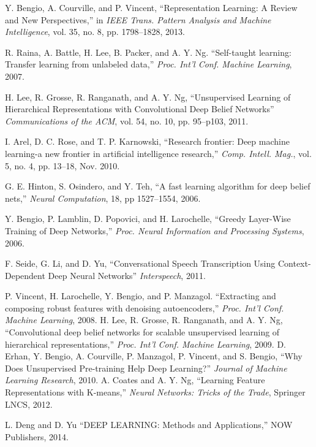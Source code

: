 \documentclass[conference]{IEEEtran}
\begin{document}
\begin{thebibliography}{99}

 Y. Bengio, A. Courville, and P. Vincent, ``Representation Learning: A Review and New Perspectives,'' in \textit{IEEE Trans. Pattern Analysis and Machine Intelligence}, vol. 35, no. 8, pp. 1798--1828, 2013.

 R. Raina, A. Battle, H. Lee, B. Packer, and A. Y. Ng. ``Self-taught learning: Transfer learning from unlabeled data,'' \textit{Proc. Int'l Conf. Machine Learning}, 2007.

 H. Lee, R. Grosse, R. Ranganath, and A. Y. Ng, ``Unsupervised Learning of Hierarchical Representations with Convolutional Deep Belief Networks'' \textit{Communications of the ACM}, vol. 54, no. 10, pp. 95--p103, 2011.


 I. Arel, D. C. Rose, and T. P. Karnowski, ``Research frontier: Deep machine learning-a new frontier in artificial intelligence research,'' \textit{Comp. Intell. Mag.}, vol. 5, no. 4, pp. 13--18, Nov. 2010.

 G. E. Hinton, S. Osindero, and Y. Teh, ``A fast learning algorithm for deep belief nets,'' \textit{Neural Computation}, 18, pp 1527--1554, 2006.

  Y. Bengio, P. Lamblin, D. Popovici, and H. Larochelle, ``Greedy Layer-Wise Training of Deep Networks,'' \textit{Proc. Neural Information and Processing Systems}, 2006.
    
 F. Seide, G. Li, and D. Yu, ``Conversational Speech Transcription Using Context-Dependent Deep Neural Networks'' \textit{Interspeech}, 2011.


 P. Vincent, H. Larochelle, Y. Bengio, and P. Manzagol. ``Extracting and composing robust features with denoising autoencoders,'' \textit{Proc. Int'l Conf. Machine Learning}, 2008.
 H. Lee, R. Grosse, R. Ranganath, and A. Y. Ng, ``Convolutional deep belief networks for scalable unsupervised learning of hierarchical representations,'' \textit{Proc. Int'l Conf. Machine Learning}, 2009.
 D. Erhan, Y. Bengio, A. Courville, P. Manzagol, P. Vincent, and S. Bengio, ``Why Does Unsupervised Pre-training Help Deep Learning?'' \textit{Journal of Machine Learning Research}, 2010.
 A. Coates and A. Y. Ng, ``Learning Feature Representations with K-means,'' \textit{Neural Networks: Tricks of the Trade}, Springer LNCS, 2012.

 L. Deng and D. Yu ``DEEP LEARNING: Methods and Applications,'' NOW Publishers, 2014.



\end{thebibliography}
\end{document}
